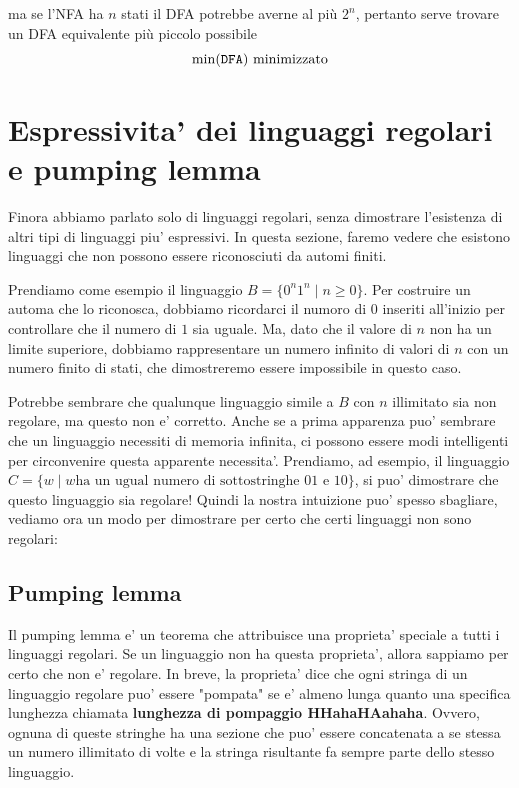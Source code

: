 ma se l'NFA ha $n$ stati il DFA potrebbe averne al più $2^n$, pertanto serve trovare un DFA equivalente più piccolo possibile
\[
    \min(\text{\texttt{DFA}}) \text{ minimizzato}
\] 

\section{Espressivita' dei linguaggi regolari e pumping lemma}
Finora abbiamo parlato solo di linguaggi regolari, senza dimostrare l'esistenza di altri tipi di linguaggi piu' espressivi. In questa sezione, faremo vedere che esistono linguaggi che non possono essere riconosciuti da automi finiti.

Prendiamo come esempio il linguaggio $ B = \{0^n 1^n \mid n \geq 0\} $. Per costruire un automa che lo riconosca, dobbiamo ricordarci il numoro di $ 0 $ inseriti all'inizio per controllare che il numero di $ 1 $ sia uguale. Ma, dato che il valore di $ n $ non ha un limite superiore, dobbiamo rappresentare un numero infinito di valori di $ n $ con un numero finito di stati, che dimostreremo essere impossibile in questo caso.

Potrebbe sembrare che qualunque linguaggio simile a $ B $ con $ n $ illimitato sia non regolare, ma questo non e' corretto. Anche se a prima apparenza puo' sembrare che un linguaggio necessiti di memoria infinita, ci possono essere modi intelligenti per circonvenire questa apparente necessita'. Prendiamo, ad esempio, il linguaggio $ C = \{w \mid w \text{ha un ugual numero di sottostringhe 01 e 10}\} $, si puo' dimostrare che questo linguaggio sia regolare! Quindi la nostra intuizione puo' spesso sbagliare, vediamo ora un modo per dimostrare per certo che certi linguaggi non sono regolari:

\subsection{Pumping lemma}
Il pumping lemma e' un teorema che attribuisce una proprieta' speciale a tutti i linguaggi regolari. Se un linguaggio non ha questa proprieta', allora sappiamo per certo che non e' regolare. In breve, la proprieta' dice che ogni stringa di un linguaggio regolare puo' essere "pompata" se e' almeno lunga quanto una specifica lunghezza chiamata \textbf{lunghezza di pompaggio HHahaHAahaha}. Ovvero, ognuna di queste stringhe ha una sezione che puo' essere concatenata a se stessa un numero illimitato di volte e la stringa risultante fa sempre parte dello stesso linguaggio. 

